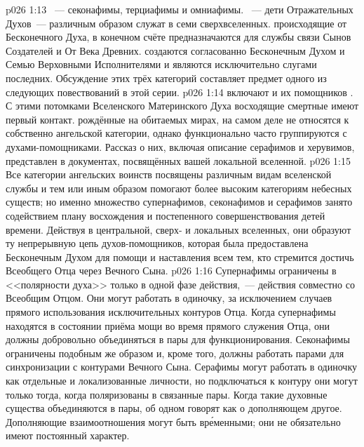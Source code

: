 \vs p026 1:13 ~--- секонафимы, терциафимы и омниафимы. ~--- дети Отражательных Духов~--- различным образом служат в семи сверхвселенных.  происходящие от Бесконечного Духа, в конечном счёте предназначаются для службы связи Сынов Создателей и От Века Древних.  создаются согласованно Бесконечным Духом и Семью Верховными Исполнителями и являются исключительно слугами последних. Обсуждение этих трёх категорий составляет предмет одного из следующих повествований в этой серии.
\vs p026 1:14  включают  и их помощников . С этими потомками Вселенского Материнского Духа восходящие смертные имеют первый контакт.  рождённые на обитаемых мирах, на самом деле не относятся к собственно ангельской категории, однако функционально часто группируются с духами\hyp{}помощниками. Рассказ о них, включая описание серафимов и херувимов, представлен в документах, посвящённых вашей локальной вселенной.
\vs p026 1:15 \pc Все категории ангельских воинств посвящены различным видам вселенской службы и тем или иным образом помогают более высоким категориям небесных существ; но именно множество супернафимов, секонафимов и серафимов занято содействием плану восхождения и постепенного совершенствования детей времени. Действуя в центральной, сверх- и локальных вселенных, они образуют ту непрерывную цепь духов\hyp{}помощников, которая была предоставлена Бесконечным Духом для помощи и наставления всем тем, кто стремится достичь Всеобщего Отца через Вечного Сына.
\vs p026 1:16 Супернафимы ограничены в <<полярности духа>> только в одной фазе действия,~--- действия совместно со Всеобщим Отцом. Они могут работать в одиночку, за исключением случаев прямого использования исключительных контуров Отца. Когда супернафимы находятся в состоянии приёма мощи во время прямого служения Отца, они должны добровольно объединяться в пары для функционирования. Секонафимы ограничены подобным же образом и, кроме того, должны работать парами для синхронизации с контурами Вечного Сына. Серафимы могут работать в одиночку как отдельные и локализованные личности, но подключаться к контуру они могут только тогда, когда поляризованы в связанные пары. Когда такие духовные существа объединяются в пары, об одном говорят как о дополняющем другое. Дополняющие взаимоотношения могут быть вр\'еменными; они не обязательно имеют постоянный характер.
